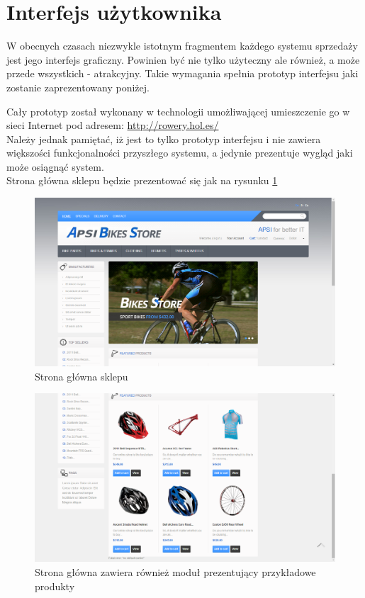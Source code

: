 \section{Interfejs użytkownika}

W obecnych czasach niezwykle istotnym fragmentem każdego systemu sprzedaży jest
jego interfejs graficzny. Powinien być nie tylko użyteczny ale również, a może
przede wszystkich - atrakcyjny. Takie wymagania spełnia prototyp interfejsu jaki
zostanie zaprezentowany poniżej.

Cały prototyp został wykonany w technologii umożliwającej umieszczenie go w
sieci Internet pod adresem:
\url{http://rowery.hol.es/} \\
Należy jednak pamiętać, iż jest to tylko prototyp interfejsu i nie zawiera
większości funkcjonalności przyszłego systemu, a jedynie prezentuje wygląd jaki
może osiągnąć system. \\

Strona główna sklepu będzie prezentować się jak na rysunku \ref{fig:MainPage}
\begin{figure}[h!]
  \centering
    \includegraphics[width=1.0\textwidth]{graphics/ui/MainPageUp.png} 
  \caption{Strona główna sklepu}
  \label{fig:MainPage}
\end{figure}
\begin{figure}[h!]
  \centering
    \includegraphics[width=\textwidth]{graphics/ui/MainPageBottom.png}
  \caption{Strona główna zawiera również moduł prezentujący przykładowe
  produkty}
  \label{fig:MainPageBottom}
\end{figure}

